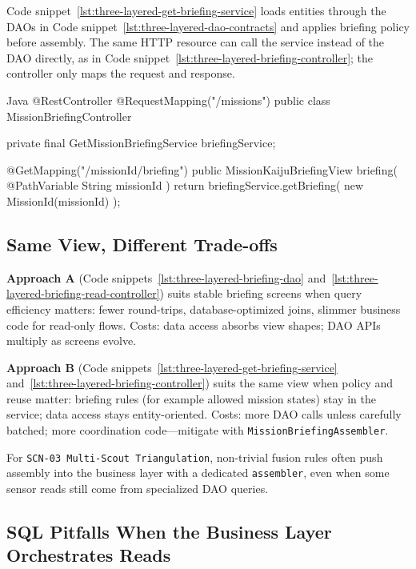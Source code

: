 Code snippet~\ref{lst:three-layered-get-briefing-service} loads entities through the DAOs in Code snippet~\ref{lst:three-layered-dao-contracts} and applies briefing policy before assembly. The same HTTP resource can call the service instead of the DAO directly, as in Code snippet~\ref{lst:three-layered-briefing-controller}; the controller only maps the request and response.

\begin{ridercode}{Java}
@RestController
@RequestMapping("/missions")
public class MissionBriefingController
{
    private final GetMissionBriefingService briefingService;

    @GetMapping("/{missionId}/briefing")
    public MissionKaijuBriefingView briefing(
        @PathVariable String missionId
    )
    {
        return briefingService.getBriefing(
            new MissionId(missionId)
        );
    }
}
\end{ridercode}
\label{lst:three-layered-briefing-controller}

\subsection{Same View, Different Trade-offs}
\label{sec:three_layered_view_assembly_tradeoffs}

\textbf{Approach A} (Code snippets~\ref{lst:three-layered-briefing-dao} and~\ref{lst:three-layered-briefing-read-controller}) suits stable briefing screens when query efficiency matters: fewer round-trips, database-optimized joins, slimmer business code for read-only flows. Costs: data access absorbs view shapes; DAO APIs multiply as screens evolve.

\textbf{Approach B} (Code snippets~\ref{lst:three-layered-get-briefing-service} and~\ref{lst:three-layered-briefing-controller}) suits the same view when policy and reuse matter: briefing rules (for example allowed mission states) stay in the service; data access stays entity-oriented. Costs: more DAO calls unless carefully batched; more coordination code---mitigate with \texttt{MissionBriefingAssembler}.

For \texttt{SCN-03 Multi-Scout Triangulation}, non-trivial fusion rules often push assembly into the business layer with a dedicated \texttt{assembler}, even when some sensor reads still come from specialized DAO queries.

\subsection{SQL Pitfalls When the Business Layer Orchestrates Reads}
\label{sec:three_layered_sql_pitfalls}

